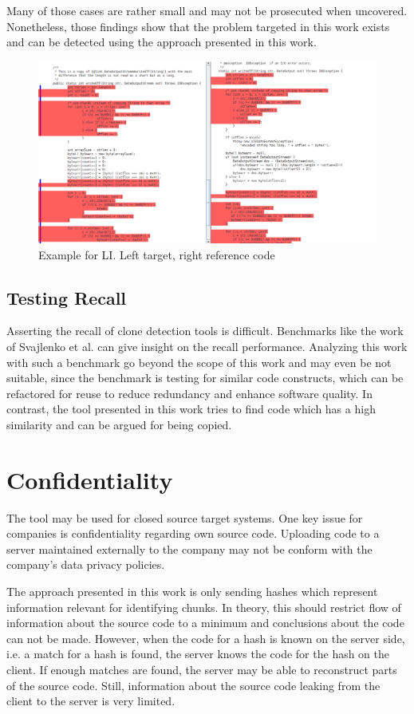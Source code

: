 Many of those cases are rather small and may not be prosecuted when uncovered.
Nonetheless, those findings show that the problem targeted in this work exists and can be detected using the approach presented in this work.
\begin{figure}[htpb]
	\centering
	\includegraphics[width=\linewidth]{figures/li.png}
	\caption{Example for LI. Left target, right reference code}\label{fig:li}
\end{figure}

\subsection{Testing Recall}
Asserting the recall of clone detection tools is difficult.
Benchmarks like the work of Svajlenko et al. \cite{svajlenko2014towards} can give insight on the recall performance.
Analyzing this work with such a benchmark go beyond the scope of this work and may even be not suitable, since the benchmark is testing for similar code constructs, which can be refactored for reuse to reduce redundancy and enhance software quality.
In contrast, the tool presented in this work tries to find code which has a high similarity and can be argued for being copied.

\section{Confidentiality}
The tool may be used for closed source target systems.
One key issue for companies is confidentiality regarding own source code.
Uploading code to a server maintained externally to the company may not be conform with the company's data privacy policies.

The approach presented in this work is only sending hashes which represent information relevant for identifying chunks.
In theory, this should restrict flow of information about the source code to a minimum and conclusions about the code can not be made.
However, when the code for a hash is known on the server side, i.e. a match for a hash is found, the server knows the code for the hash on the client.
If enough matches are found, the server may be able to reconstruct parts of the source code.
Still, information about the source code leaking from the client to the server is very limited.